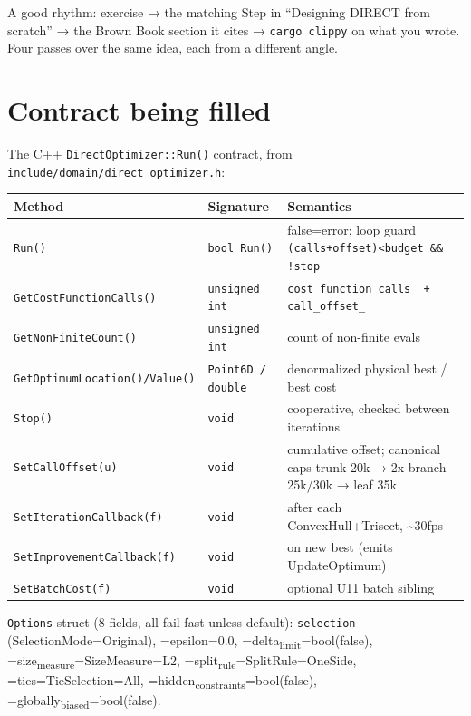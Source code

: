 \documentclass[11pt]{article}
\begin{document}
A good rhythm: exercise → the matching Step in ``Designing DIRECT from scratch''
→ the Brown Book section it cites → \texttt{cargo clippy} on what you wrote. Four
passes over the same idea, each from a different angle.
\section{Contract being filled}
\label{sec:org144ee96}

The C++ \texttt{DirectOptimizer::Run()} contract, from \texttt{include/domain/direct\_optimizer.h}:

\begin{center}
\begin{tabular}{lll}
Method & Signature & Semantics\\
\hline
\texttt{Run()} & \texttt{bool Run()} & false=error; loop guard \texttt{(calls+offset)<budget \&\& !stop}\\
\texttt{GetCostFunctionCalls()} & \texttt{unsigned int} & \texttt{cost\_function\_calls\_ + call\_offset\_}\\
\texttt{GetNonFiniteCount()} & \texttt{unsigned int} & count of non-finite evals\\
\texttt{GetOptimumLocation()/Value()} & \texttt{Point6D / double} & denormalized physical best / best cost\\
\texttt{Stop()} & \texttt{void} & cooperative, checked between iterations\\
\texttt{SetCallOffset(u)} & \texttt{void} & cumulative offset; canonical caps trunk 20k → 2x branch 25k/30k → leaf 35k\\
\texttt{SetIterationCallback(f)} & \texttt{void} & after each ConvexHull+Trisect, \textasciitilde{}30fps\\
\texttt{SetImprovementCallback(f)} & \texttt{void} & on new best (emits UpdateOptimum)\\
\texttt{SetBatchCost(f)} & \texttt{void} & optional U11 batch sibling\\
\end{tabular}
\end{center}

\texttt{Options} struct (8 fields, all fail-fast unless default):
\texttt{selection} (SelectionMode=Original), =epsilon=0.0, =delta\textsubscript{limit}=bool(false),
=size\textsubscript{measure}=SizeMeasure=L2, =split\textsubscript{rule}=SplitRule=OneSide,
=ties=TieSelection=All, =hidden\textsubscript{constraints}=bool(false),
=globally\textsubscript{biased}=bool(false).
\end{document}
